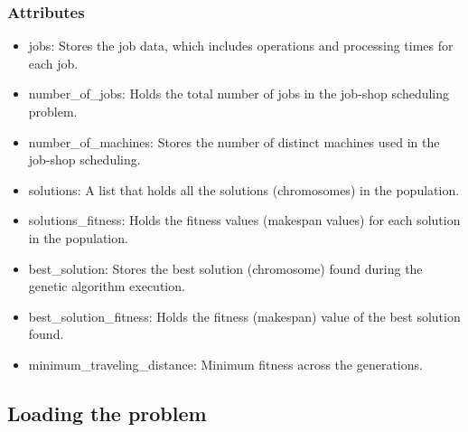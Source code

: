 \documentclass[11pt, a4paper]{article}
\begin{document}
\subsubsection{Attributes}

\begin{itemize}
    \item jobs: Stores the job data, which includes operations and processing times for each job.
    \item number\_of\_jobs: Holds the total number of jobs in the job-shop scheduling problem.
    \item number\_of\_machines: Stores the number of distinct machines used in the job-shop scheduling.
    \item solutions: A list that holds all the solutions (chromosomes) in the population.
    \item solutions\_fitness: Holds the fitness values (makespan values) for each solution in the population.
    \item best\_solution: Stores the best solution (chromosome) found during the genetic algorithm execution.
    \item best\_solution\_fitness: Holds the fitness (makespan) value of the best solution found.
    \item minimum\_traveling\_distance: Minimum fitness across the generations.
\end{itemize}

\subsection{Loading the problem}
\end{document}
